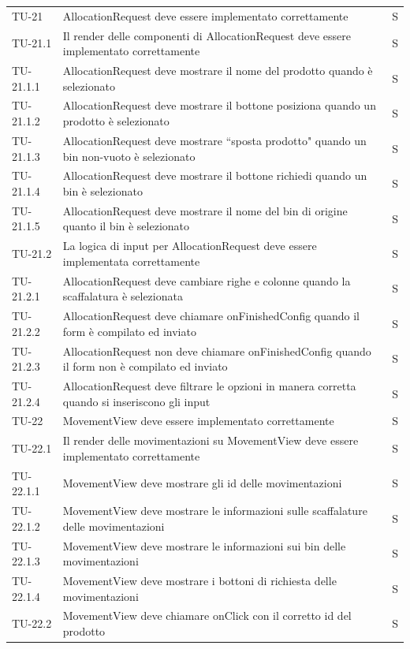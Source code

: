 \begin{xltabular}{0.9\textwidth}{X | p{0.6\textwidth} | p{0.1\textwidth} }
    TU-21 & AllocationRequest deve essere implementato correttamente & S\\
    TU-21.1 & Il render delle componenti di AllocationRequest deve essere implementato correttamente & S\\
    TU-21.1.1 & AllocationRequest deve mostrare il nome del prodotto quando è selezionato & S\\ 
    TU-21.1.2 & AllocationRequest deve mostrare il bottone posiziona quando un prodotto è selezionato & S\\ 
    TU-21.1.3 & AllocationRequest deve mostrare ``sposta prodotto" quando un bin non-vuoto è selezionato & S\\ 
    TU-21.1.4 & AllocationRequest deve mostrare il bottone richiedi quando un bin è selezionato & S\\ 
    TU-21.1.5 & AllocationRequest deve mostrare il nome del bin di origine quanto il bin è selezionato & S\\ 
    TU-21.2 & La logica di input per AllocationRequest deve essere implementata correttamente & S\\
    TU-21.2.1 & AllocationRequest deve cambiare righe e colonne quando la scaffalatura è selezionata & S\\
    TU-21.2.2 & AllocationRequest deve chiamare onFinishedConfig quando il form è compilato ed inviato & S\\
    TU-21.2.3 & AllocationRequest non deve chiamare onFinishedConfig quando il form non è compilato ed inviato & S\\
    TU-21.2.4 & AllocationRequest deve filtrare le opzioni in manera corretta quando si inseriscono gli input & S\\

    TU-22 & MovementView deve essere implementato correttamente & S\\
    TU-22.1 & Il render delle movimentazioni su MovementView deve essere implementato correttamente & S\\
    TU-22.1.1 & MovementView deve mostrare gli id delle movimentazioni & S\\
    TU-22.1.2 & MovementView deve mostrare le informazioni sulle scaffalature delle movimentazioni & S\\
    TU-22.1.3 & MovementView deve mostrare le informazioni sui bin delle movimentazioni & S\\
    TU-22.1.4 & MovementView deve mostrare i bottoni di richiesta delle movimentazioni & S\\
    TU-22.2 & MovementView deve chiamare onClick con il corretto id del prodotto & S\\
\end{xltabular}

